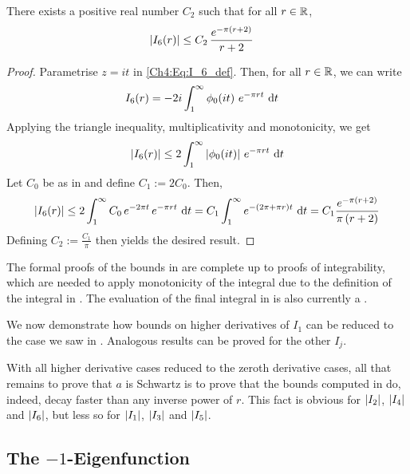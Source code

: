 \begin{boxlemma}\label{Ch4:Lemma:Bound_I6}
    There exists a positive real number $C_2$ such that for all $r \in \mathbb{R}$,
    \begin{align*}
        \left\lvert I_6(r) \right\rvert &\leq C_2 \, \frac{e^{-\pi \left( r + 2 \right)}}{r + 2}
    \end{align*}
\end{boxlemma}
\begin{proof}
    Parametrise $z = it$ in \eqref{Ch4:Eq:I_6_def}. Then, for all $r \in \mathbb{R}$, we can write
    \begin{align*}
        I_6(r) &= -2i \int_{1}^{\infty} \phi_0\!\left( it \right) \, e^{- \pi r t} \, \operatorname{d}\!{t}
    \end{align*}
    Applying the triangle inequality, multiplicativity and monotonicity, we get
    \begin{align*}
        \left\lvert I_6(r) \right\rvert \leq 2\int_{1}^{\infty}
            \left\lvert \phi_0\!\left( it \right) \right\rvert \,
            e^{-\pi r t} \,
            \operatorname{d}\!{t}
    \end{align*}
    Let $C_0$ be as in  and define $C_1 := 2 C_0$. Then,
    \begin{align*}
        \left\lvert I_6(r) \right\rvert \leq 2\int_{1}^{\infty}
            C_0 \,
            e^{-2 \pi t} \,
            e^{-\pi r t} \,
            \operatorname{d}\!{t}
        = C_1 \int_{1}^{\infty} e^{-\left( 2\pi + \pi r \right)t} \, \operatorname{d}\!{t}
        = C_1 \frac{e^{-\pi\left( r + 2 \right)}}{\pi\left( r + 2 \right)}
    \end{align*}
    Defining $C_2 := \frac{C_1}{\pi}$ then yields the desired result.
\end{proof}

The formal proofs of the bounds in  are complete up to proofs of integrability, which are needed to apply monotonicity of the integral due to the definition of the integral in \mathlib. The evaluation of the final integral in  is also currently a \sorry.

We now demonstrate how bounds on higher derivatives of $I_1$ can be reduced to the case we saw in . Analogous results can be proved for the other $I_j$.


With all higher derivative cases reduced to the zeroth derivative cases, all that remains to prove that $a$ is Schwartz is to prove that the bounds computed in  do, indeed, decay faster than any inverse power of $r$. This fact is obvious for $\left\lvert I_2 \right\rvert$, $\left\lvert I_4 \right\rvert$ and $\left\lvert I_6 \right\rvert$, but less so for $\left\lvert I_1 \right\rvert$, $\left\lvert I_3 \right\rvert$ and $\left\lvert I_5 \right\rvert$.


\subsection{The $-1$-Eigenfunction}